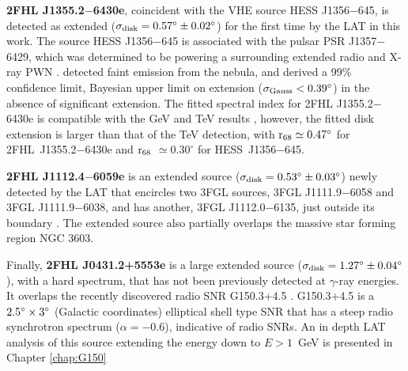 {\bfseries 2FHL J1355.2$-$6430e}, coincident with the VHE source HESS J1356$-$645, is detected as extended (${\rm \sigma_{disk} =  0.57^{\circ} \pm 0.02^{\circ}}$) for the first time by the LAT in this work. The  source HESS J1356$-$645 \citep{Abramowski11} is associated with the pulsar PSR J1357$-$6429, which was determined to be powering a surrounding extended radio and X-ray PWN \citep{Lemoine-Goumard11}. \cite{Acero13} detected faint emission from the nebula, and derived a 99\% confidence limit, Bayesian upper limit on extension (${\rm \sigma_{Gauss} < 0.39^{\circ}}$) in the absence of significant extension. The fitted spectral index for 2FHL J1355.2$-$6430e is compatible with the GeV and TeV results \citep{Acero13,Abramowski11}, however, the fitted disk extension is larger than that of the TeV detection, with ${\rm r_{68} \simeq 0.47^{\circ}}$ for 2FHL~J1355.2$-$6430e and ${\rm r_{68}}$ $\simeq 0.30^{\circ}$ for HESS~J1356$-$645.

{\bfseries 2FHL J1112.4$-$6059e} is an extended source (${\rm \sigma_{disk} =  0.53^{\circ} \pm 0.03^{\circ}}$) newly detected by the LAT that encircles two 3FGL sources, 3FGL J1111.9$-$6058 and 3FGL J1111.9$-$6038, and has another, 3FGL J1112.0$-$6135, just outside its boundary \citep{3FGL}. The extended source also partially overlaps the massive star forming region NGC 3603. %

Finally, {\bfseries 2FHL J0431.2+5553e} is a large extended source (${\rm \sigma_{disk} =  1.27^{\circ} \pm 0.04^{\circ}}$), with { a hard spectrum}, that has not been previously detected at $\gamma$-ray energies. It overlaps the recently discovered radio SNR G150.3+4.5 \citep{Gao14}. G150.3+4.5 is a ${\rm 2.5^{\circ}}\times {\rm 3^{\circ}}$ (Galactic coordinates)
elliptical shell type SNR that has a steep radio synchrotron spectrum ($\alpha = -0.6$), indicative of radio SNRs. An in depth LAT analysis of this source extending the energy down to $E > 1$~GeV is presented in Chapter \ref{chap:G150}


